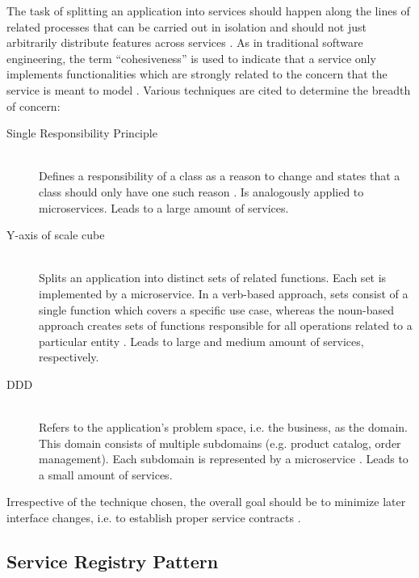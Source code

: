 The task of splitting an application into services should happen along the lines of related processes that can be carried out in isolation and should not just arbitrarily distribute features across services \cite[p.~61]{taibi2018definition}. As in traditional software engineering, the term \enquote{cohesiveness} is used to indicate that a service only implements functionalities which are strongly related to the concern that the service is meant to model \cite[p.~2]{dragoni2017microservices}. Various techniques are cited to determine the breadth of concern:

\begin{description}
  \item[Single Responsibility Principle]
  \hfill \\
  Defines a responsibility of a class as a reason to change and states that a class should only have one such reason \cite[p.~36]{messina2016simplified} \cite[p.~116]{thones2015microservices}. Is analogously applied to microservices. Leads to a large amount of services.

  \item[Y-axis of \gls{scale cube}]
  \hfill \\
  Splits an application into distinct sets of related functions. Each set is implemented by a microservice. In a verb-based approach, sets consist of a single function which covers a specific use case, whereas the noun-based approach creates sets of functions responsible for all operations related to a particular entity \cite[p.~36]{messina2016simplified}. Leads to large and medium amount of services, respectively.

  \item[\acl*{DDD}]
  \hfill \\
  Refers to the application's problem space, i.e. the business, as the domain. This domain consists of multiple subdomains (e.g. product catalog, order management). Each subdomain is represented by a microservice \cite[p.~3]{balalaie2016microservices}. Leads to a small amount of services.
\end{description}

Irrespective of the technique chosen, the overall goal should be to minimize later interface changes, i.e. to establish proper service contracts \cite[p.~26]{dmitry2014micro}.


\subsection{Service Registry Pattern}
\label{sec:service-registry-pattern}

